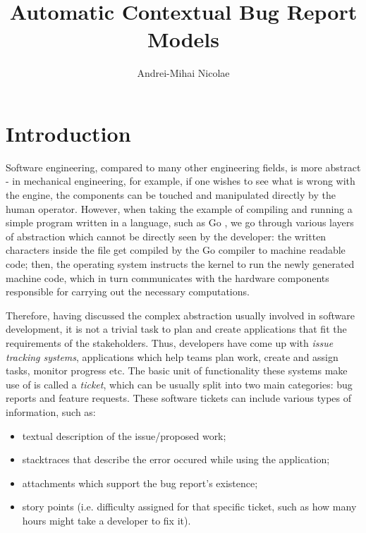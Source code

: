 \documentclass[11pt,english,twocolumn]{article}
\begin{document}
\title{Automatic Contextual Bug Report Models}

\author{Andrei-Mihai Nicolae}
\date{}
\maketitle

\section{Introduction}
\label{sec:Introduction}

Software engineering, compared to many other engineering fields, is more
abstract \cite{brooks1995mythical} - in mechanical engineering, for example,
if one wishes to see what is wrong with the engine, the components can be 
touched and manipulated directly by the human operator. However, when taking the example of
compiling and running a simple program written in a language, such as Go 
\cite{golang}, we go through various layers of abstraction which cannot be directly 
seen by the developer: the written characters inside the file get compiled by the
Go compiler to machine readable code; then, the operating system instructs the 
kernel to run the newly generated machine code, which in turn communicates with 
the hardware components responsible for carrying out the necessary computations.

Therefore, having discussed the complex abstraction usually involved in software development,
it is not a trivial task to plan and create applications that fit the requirements of the
stakeholders. Thus, developers have come up with \emph{issue tracking systems}, applications
which help teams plan work, create and assign tasks, monitor progress etc. The basic unit of
functionality these systems make use of is called a \emph{ticket}, which can be usually split
into two main categories: bug reports and feature requests. These software tickets can include 
various types of information, such as:
\begin{itemize}
	\item textual description of the issue/proposed work;
	\item stacktraces that describe the error occured while using the application;
	\item attachments which support the bug report's existence;
	\item story points (i.e. difficulty assigned for that specific ticket, such as 
	how many hours might take a developer to fix it).
\end{itemize}
\end{document}

